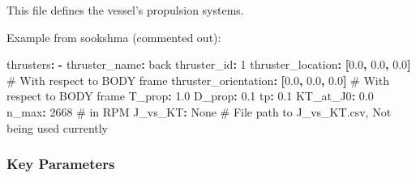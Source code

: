 \documentclass[
  letterpaper,
  DIV=11,
  numbers=noendperiod]{scrreprt}
\newenvironment{Shaded}{\begin{snugshade}}{\end{snugshade}}
\newcommand{\AttributeTok}[1]{\textcolor[rgb]{0.40,0.45,0.13}{#1}}
\newcommand{\CommentTok}[1]{\textcolor[rgb]{0.37,0.37,0.37}{#1}}
\newcommand{\DecValTok}[1]{\textcolor[rgb]{0.68,0.00,0.00}{#1}}
\newcommand{\FloatTok}[1]{\textcolor[rgb]{0.68,0.00,0.00}{#1}}
\newcommand{\FunctionTok}[1]{\textcolor[rgb]{0.28,0.35,0.67}{#1}}
\newcommand{\KeywordTok}[1]{\textcolor[rgb]{0.00,0.23,0.31}{\textbf{#1}}}
\begin{document}
This file defines the vessel's propulsion systems.

Example from sookshma (commented out):

\begin{Shaded}
\begin{Highlighting}[]
\AttributeTok{ }\FunctionTok{thrusters}\KeywordTok{:}\AttributeTok{ }
\AttributeTok{   }\KeywordTok{{-}}\AttributeTok{ }
\AttributeTok{     }\FunctionTok{thruster\_name}\KeywordTok{:}\AttributeTok{ back}
\AttributeTok{     }\FunctionTok{thruster\_id}\KeywordTok{:}\AttributeTok{ }\DecValTok{1}
\AttributeTok{     }\FunctionTok{thruster\_location}\KeywordTok{:}\AttributeTok{ }\KeywordTok{[}\FloatTok{0.0}\KeywordTok{,}\AttributeTok{ }\FloatTok{0.0}\KeywordTok{,}\AttributeTok{ }\FloatTok{0.0}\KeywordTok{]}\CommentTok{    \# With respect to BODY frame}
\AttributeTok{     }\FunctionTok{thruster\_orientation}\KeywordTok{:}\AttributeTok{ }\KeywordTok{[}\FloatTok{0.0}\KeywordTok{,}\AttributeTok{ }\FloatTok{0.0}\KeywordTok{,}\AttributeTok{ }\FloatTok{0.0}\KeywordTok{]}\CommentTok{  \# With respect to BODY frame}
\AttributeTok{     }\FunctionTok{T\_prop}\KeywordTok{:}\AttributeTok{ }\FloatTok{1.0}
\AttributeTok{     }\FunctionTok{D\_prop}\KeywordTok{:}\AttributeTok{ }\FloatTok{0.1}
\AttributeTok{     }\FunctionTok{tp}\KeywordTok{:}\AttributeTok{ }\FloatTok{0.1}
\AttributeTok{     }\FunctionTok{KT\_at\_J0}\KeywordTok{:}\AttributeTok{ }\FloatTok{0.0}\AttributeTok{ }
\AttributeTok{     }\FunctionTok{n\_max}\KeywordTok{:}\AttributeTok{ }\DecValTok{2668}\CommentTok{ \# in RPM}
\AttributeTok{     }\FunctionTok{J\_vs\_KT}\KeywordTok{:}\AttributeTok{ None}\CommentTok{ \# File path to J\_vs\_KT.csv, Not being used currently}
\end{Highlighting}
\end{Shaded}

\subsubsection*{Key Parameters}\label{key-parameters-5}
\end{document}
